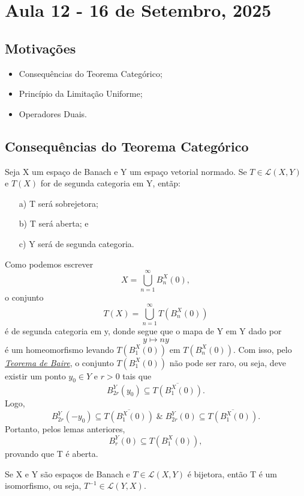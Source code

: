 \documentclass[../functional_analysis.tex]{subfiles}
\begin{document}
\section{Aula 12 - 16 de Setembro, 2025}
\subsection{Motivações}
\begin{itemize}
	\item Consequências do Teorema Categórico;
	\item Princípio da Limitação Uniforme;
	\item Operadores Duais.
\end{itemize}
\subsection{Consequências do Teorema Categórico}
\begin{theorem*}
	Seja X um espaço de Banach e Y um espaço vetorial normado. Se \(T\in \mathcal{L}(X, Y)\) e \(T(X)\) for de segunda categoria em Y, entãp:
	\begin{itemize}
		\item[a)] T será sobrejetora;
		\item[b)] T será aberta; e
		\item[c)] Y será de segunda categoria.
	\end{itemize}
\end{theorem*}
\begin{proof*}
	Como podemos escrever
	\[
		X = \bigcup_{n=1}^{\infty}B_{n}^{X}(0),
	\]
	o conjunto
	\[
		T(X) = \bigcup_{n=1}^{\infty}T(B_{n}^{X}(0))
	\]
	é de segunda categoria em y, donde segue que o mapa de Y em Y dado por
	\[
		y\mapsto ny
	\]
	é um homeomorfismo levando \(T(B_{1}^{X}(0))\) em \(T(B_{n}^{X}(0))\). Com isso, pelo \hyperlink{baire_theorem}{\textit{Teorema de Baire}}, o conjunto
	\(T(B_{1}^{X}(0))\) não pode ser raro, ou seja, deve existir um ponto \(y_{0}\in Y\) e \(r > 0\) tais que
	\[
		B_{2r}^{Y}(y_{0})\subseteq \overline{T(B_{1}^{X}(0))}.
	\]
	Logo,
	\[
		B_{2r}^{Y}(-y_{0})\subseteq \overline{T(B_{1}^{X}(0))}\;\&\; B_{2r}^{Y}(0)\subseteq \overline{T(B_{1}^{X}(0))}.
	\]
	Portanto, pelos lemas anteriores,
	\[
		B_{r}^{Y}(0)\subseteq T(B_{1}^{X}(0)),
	\]
	provando que T é aberta. \qedsymbol
\end{proof*}
\begin{crl*}
	Se X e Y são espaços de Banach e \(T\in \mathcal{L}(X, Y)\) é bijetora, então T é um isomorfismo, ou seja, \(T^{-1}\in \mathcal{L}(Y, X)\).
\end{crl*}
\end{document}
